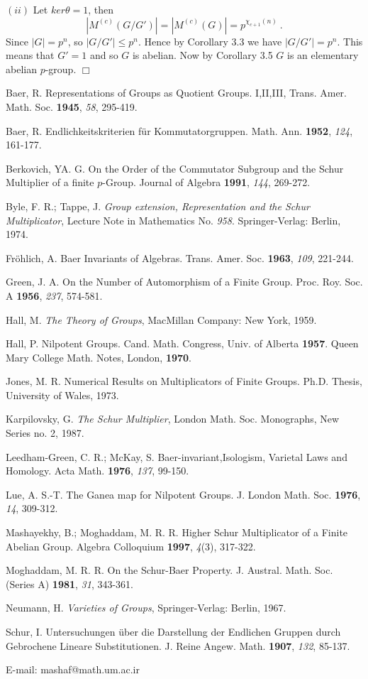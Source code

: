 $(ii)$ Let $ker\theta =1$, then
$$|M^{(c)}(G/G')|=|M^{(c)}(G)|=p^{\chi_{c+1}(n)}\ .$$
Since $|G|=p^n$, so $|G/G'|\leq p^n$. Hence by Corollary 3.3 we have
$|G/G'|=p^n$. This means that $G'=1$ and so $G$ is abelian. Now by Corollary 3.5
$G$ is an elementary abelian $p$-group. $\Box$
\begin{thebibliography}{16}
 Baer, R. Representations of Groups as Quotient Groups. I,II,III,
Trans. Amer. Math. Soc. {\bf 1945}, {\it 58}, 295-419.

 Baer, R. Endlichkeitskriterien f\"{u}r Kommutatorgruppen. Math.
Ann. {\bf 1952}, {\it 124}, 161-177.

 Berkovich, YA. G. On the Order of the Commutator Subgroup and the Schur Multiplier of a finite $p$-Group. Journal of Algebra {\bf 1991}, {\it 144}, 269-272.

 Byle, F. R.; Tappe, J. {\it Group extension, Representation and
the Schur Multiplicator}, Lecture Note in Mathematics No. {\it 958}.
Springer-Verlag: Berlin, 1974.

 Fr\"{o}hlich, A. Baer Invariants of Algebras. Trans. Amer.
Soc. {\bf 1963}, {\it 109}, 221-244.

 Green, J. A. On the Number of Automorphism of a Finite Group.
Proc. Roy. Soc. A {\bf 1956}, {\it 237}, 574-581.

 Hall, M. {\it The Theory of Groups}, MacMillan
Company: New York, 1959.

 Hall, P. Nilpotent Groups. Cand. Math. Congress, Univ. of
Alberta {\bf 1957}.  Queen Mary College Math. Notes, London, {\bf 1970}.

 Jones, M. R. Numerical Results on Multiplicators of Finite Groups. Ph.D. Thesis, University of Wales, 1973.

 Karpilovsky, G. {\it The Schur Multiplier}, London Math. Soc.
Monographs, New Series no. 2, 1987.

 Leedham-Green, C. R.; McKay, S. Baer-invariant,Isologism,
Varietal Laws and Homology.  Acta Math. {\bf 1976}, {\it 137}, 99-150.

 Lue, A. S.-T. The Ganea map for Nilpotent Groups. J. London
Math. Soc. {\bf 1976}, {\it 14}, 309-312.

 Mashayekhy, B.; Moghaddam, M. R. R. Higher Schur Multiplicator of
a Finite Abelian Group. Algebra Colloquium {\bf 1997}, {\it 4}(3), 317-322.

 Moghaddam, M. R. R. On the Schur-Baer Property. J. Austral.
Math. Soc. (Series A) {\bf 1981}, {\it 31}, 343-361.

 Neumann, H. {\it Varieties of Groups}, Springer-Verlag: Berlin, 1967.

 Schur, I. Untersuchungen \"{u}ber die Darstellung der Endlichen
Gruppen durch Gebrochene Lineare Substitutionen. J. Reine Angew.
Math. {\bf 1907}, {\it 132}, 85-137.
\end{thebibliography}
E-mail: mashaf@math.um.ac.ir

